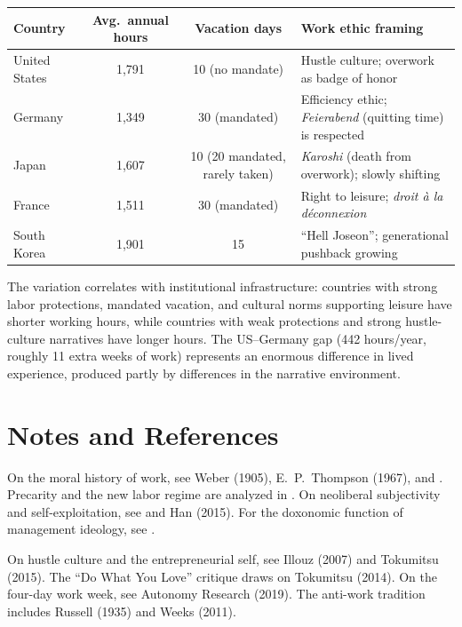 \begin{example}
\label{ex:work-culture-comparison}
\begin{center}
\begin{tabular}{p{2.5cm}ccp{4cm}}
\toprule
Country & Avg.\ annual hours & Vacation days & Work ethic framing \\
\midrule
United States & 1,791 & 10 (no mandate) & Hustle culture; overwork as badge of honor \\[4pt]
Germany & 1,349 & 30 (mandated) & Efficiency ethic; \emph{Feierabend} (quitting time) is respected \\[4pt]
Japan & 1,607 & 10 (20 mandated, rarely taken) & \emph{Karoshi} (death from overwork); slowly shifting \\[4pt]
France & 1,511 & 30 (mandated) & Right to leisure; \emph{droit \`{a} la d\'{e}connexion} \\[4pt]
South Korea & 1,901 & 15 & ``Hell Joseon''; generational pushback growing \\
\bottomrule
\end{tabular}
\end{center}

The variation correlates with institutional infrastructure: countries with strong labor protections, mandated vacation, and cultural norms supporting leisure have shorter working hours, while countries with weak protections and strong hustle-culture narratives have longer hours.
The US--Germany gap (442 hours/year, roughly 11 extra weeks of work) represents an enormous difference in lived experience, produced partly by differences in the narrative environment.
\end{example}

\section{Notes and References}
\label{sec:ch26-notes}

On the moral history of work, see Weber (1905), E.\ P.\ Thompson (1967), and \textcite{sennett1998}.
Precarity and the new labor regime are analyzed in \textcite{standing2011}.
On neoliberal subjectivity and self-exploitation, see \textcite{brown2015} and Han (2015).
For the doxonomic function of management ideology, see \textcite{bourdieu1991}.

On hustle culture and the entrepreneurial self, see Illouz (2007) and Tokumitsu (2015).
The ``Do What You Love'' critique draws on Tokumitsu (2014).
On the four-day work week, see Autonomy Research (2019).
The anti-work tradition includes Russell (1935) and Weeks (2011).

